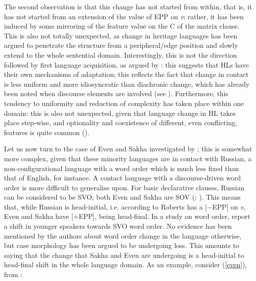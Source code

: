 \documentclass[output=paper]{langscibook}
\begin{document}
The second observation is that this change has not started from within, that is, it has not started from an extension of the value of EPP on \textit{v}; rather, it has been induced by some mirroring of the feature value on the C of the matrix clause. This is also not totally unexpected, as change in heritage languages has been argued to penetrate the structure from a peripheral/edge position and slowly extend to the whole sentential domain. Interestingly, this is not the direction followed by first language acquisition, as argued by \citet{RobertsHolmberg2010}: this suggests that HLs have their own mechanisms of adaptation; this reflects the fact that change in contact is less uniform and more idiosyncratic than diachronic change, which has already been noted when discourse elements are involved (see \citet{DAlessandroEtAlIP}). Furthermore, this tendency to uniformity and reduction of complexity has taken place within one domain: this is also not unexpected, given that language change in HL takes place step-wise, and optionality and coexistence of different, even conflicting, features is quite common (\citealt{Polinsky2018, AalberseMuysken2019}).

Let us now turn to the case of Even and Sakha investigated by \citet{GrenobleOsipov2023}; this is somewhat more complex, given that these minority languages are in contact with Russian, a non-configurational language with a word order which is much less fixed than that of English, for instance. A contact language with a discourse-driven word order is more difficult to generalise upon. For basic declarative clauses, Russian can be considered to be SVO; both Even and Sakha are SOV (\citealt{Malchukov1995}; \citealt{Stachowski1998}). This means that, while Russian is head-initial, i.e. according to Roberts has a [$-$EPP] on \textit{v}, Even and Sakha have [$+$EPP], being head-final. In a study on word order, \citeauthor{GrenobleOsipov2023} report a shift in younger speakers towards SVO word order. No evidence has been mentioned by the authors about word order change in the language otherwise, but case morphology has been argued to be undergoing loss. This amounts to saying that the change that Sakha and Even are undergoing is a head-initial to head-final shift in the whole language domain. As an example, consider (\ref{even}), from \citet[33]{GrenobleOsipov2023}:
 
\end{document}
